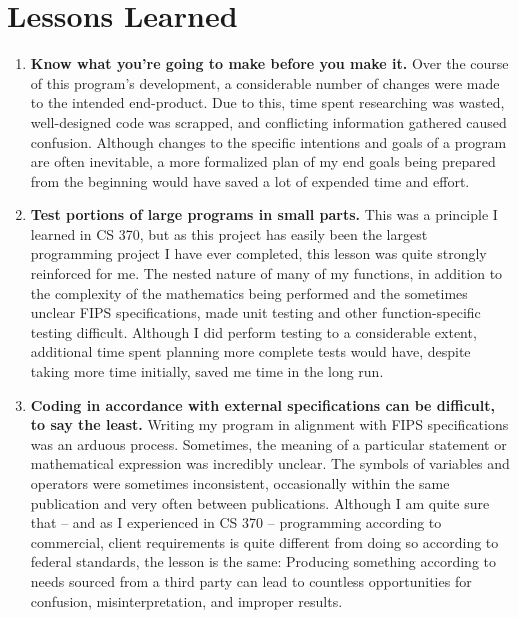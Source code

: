 \documentclass[11pt]{article}
\begin{document}
\section{Lessons Learned}

\begin{enumerate}
\item
{
\textbf{Know what you're going to make before you make it.} Over the course of this program's development, a considerable number of changes were made to the intended end-product. Due to this, time spent researching was wasted, well-designed code was scrapped, and conflicting information gathered caused confusion. Although changes to the specific intentions and goals of a program are often inevitable, a more formalized plan of my end goals being prepared from the beginning would have saved a lot of expended time and effort.
}
\item 
{
\textbf{Test portions of large programs in small parts.} This was a principle I learned in CS 370, but as this project has easily been the largest programming project I have ever completed, this lesson was quite strongly reinforced for me. The nested nature of many of my functions, in addition to the complexity of the mathematics being performed and the sometimes unclear FIPS specifications, made unit testing and other function-specific testing difficult. Although I did perform testing to a considerable extent, additional time spent planning more complete tests would have, despite taking more time initially, saved me time in the long run.
}
\item
{
\textbf{Coding in accordance with external specifications can be difficult, to say the least.} Writing my program in alignment with FIPS specifications was an arduous process. Sometimes, the meaning of a particular statement or mathematical expression was incredibly unclear. The symbols of variables and operators were sometimes inconsistent, occasionally within the same publication and very often between publications. Although I am quite sure that -- and as I experienced in CS 370 -- programming according to commercial, client requirements is quite different from doing so according to federal standards, the lesson is the same: Producing something according to needs sourced from a third party can lead to countless opportunities for confusion, misinterpretation, and improper results.
} 
\end{enumerate}
\end{document}
